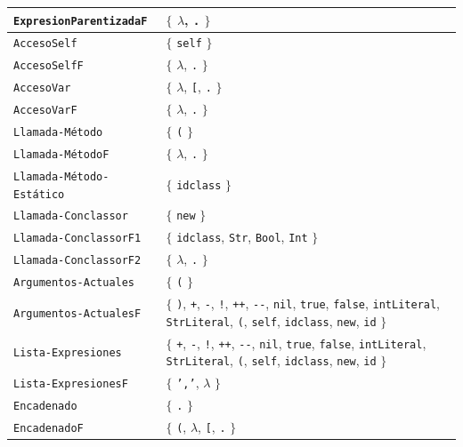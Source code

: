 \begin{longtable}{|
>{\raggedright\arraybackslash}p{}|
>{\raggedright\arraybackslash}p{}|}
\texttt{ExpresionParentizadaF} & \(\{\) \(\lambda\), \texttt{.} \(\}\) \\ \hline
\texttt{AccesoSelf} & \(\{\) \texttt{self} \(\}\) \\ \hline
\texttt{AccesoSelfF} & \(\{\) \(\lambda\), \texttt{.} \(\}\) \\ \hline
\texttt{AccesoVar} & \(\{\) \(\lambda\), \texttt{[}, \texttt{.} \(\}\) \\ \hline
\texttt{AccesoVarF} & \(\{\) \(\lambda\), \texttt{.} \(\}\) \\ \hline
\texttt{Llamada-Método} & \(\{\) \texttt{(} \(\}\) \\ \hline
\texttt{Llamada-MétodoF} & \(\{\) \(\lambda\), \texttt{.} \(\}\) \\ \hline
\texttt{Llamada-Método-Estático} & \(\{\) \texttt{idclass} \(\}\) \\ \hline
\texttt{Llamada-Conclassor} & \(\{\) \texttt{new} \(\}\) \\ \hline
\texttt{Llamada-ConclassorF1} & \(\{\) \texttt{idclass}, \texttt{Str}, \texttt{Bool}, \texttt{Int} \(\}\) \\ \hline
\texttt{Llamada-ConclassorF2} & \(\{\) \(\lambda\), \texttt{.} \(\}\) \\ \hline
\texttt{Argumentos-Actuales} & \(\{\) \texttt{(} \(\}\) \\ \hline
\texttt{Argumentos-ActualesF} & \(\{\) \texttt{)}, \texttt{+}, \texttt{-}, \texttt{!}, \texttt{++}, \texttt{-{}-}, \texttt{nil}, \texttt{true}, \texttt{false}, \texttt{intLiteral}, \texttt{StrLiteral}, \texttt{(}, \texttt{self}, \texttt{idclass}, \texttt{new}, \texttt{id} \(\}\) \\ \hline
\texttt{Lista-Expresiones} & \(\{\) \texttt{+}, \texttt{-}, \texttt{!}, \texttt{++}, \texttt{-{}-}, \texttt{nil}, \texttt{true}, \texttt{false}, \texttt{intLiteral}, \texttt{StrLiteral}, \texttt{(}, \texttt{self}, \texttt{idclass}, \texttt{new}, \texttt{id} \(\}\) \\ \hline
\texttt{Lista-ExpresionesF} & \(\{\) \texttt{','}, \(\lambda\) \(\}\) \\ \hline
\texttt{Encadenado} & \(\{\) \texttt{.} \(\}\) \\ \hline
\texttt{EncadenadoF} & \(\{\) \texttt{(}, \(\lambda\), \texttt{[}, \texttt{.} \(\}\) \\ \hline
\end{longtable}
\endgroup
